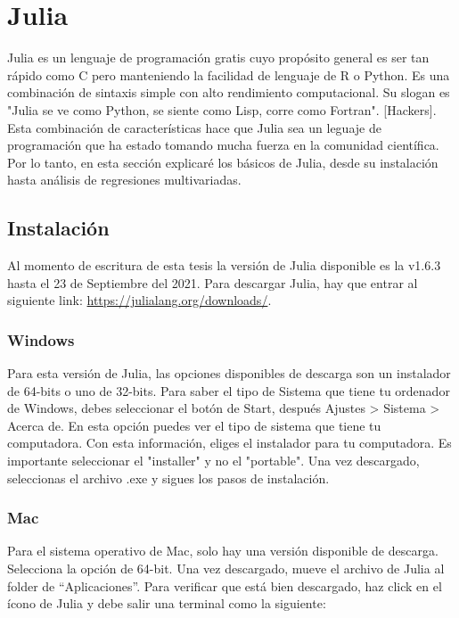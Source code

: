 \chapter{Julia}

Julia es un lenguaje de programación gratis cuyo propósito general es ser tan rápido como C 
pero manteniendo la facilidad de lenguaje de R o Python. Es una combinación de sintaxis simple con alto rendimiento computacional. Su slogan es "Julia se ve como Python, se siente como Lisp, corre como Fortran". [Hackers]. 
Esta combinación de características hace que Julia sea un leguaje de programación que ha estado tomando mucha fuerza en la comunidad científica. Por lo tanto, en esta sección explicaré los básicos de Julia, desde su instalación hasta análisis de regresiones multivariadas. 

\section{Instalación}
Al momento de escritura de esta tesis la versión de Julia disponible es la v1.6.3 hasta el 23 de Septiembre del 2021. Para descargar Julia, hay que entrar al siguiente link: \url{https://julialang.org/downloads/}. 

\subsection{Windows}
Para esta versión de Julia, las opciones disponibles de descarga son un instalador de 64-bits o uno de 32-bits. Para saber el tipo de Sistema que tiene tu ordenador de Windows, debes seleccionar el botón de Start, después Ajustes > Sistema > Acerca de. En esta opción puedes ver el tipo de sistema que tiene tu computadora. Con esta información, eliges el instalador para tu computadora. Es importante seleccionar el "installer" y no el "portable". Una vez descargado, seleccionas el archivo .exe y sigues los pasos de instalación. 


\subsection{Mac}
Para el sistema operativo de Mac, solo hay una versión disponible de descarga. Selecciona la opción de 64-bit. Una vez descargado, mueve el archivo de Julia al folder de \textquotedblleft Aplicaciones\textquotedblright. Para verificar que está bien descargado, haz click en el ícono de Julia y debe salir una terminal como la siguiente: 


